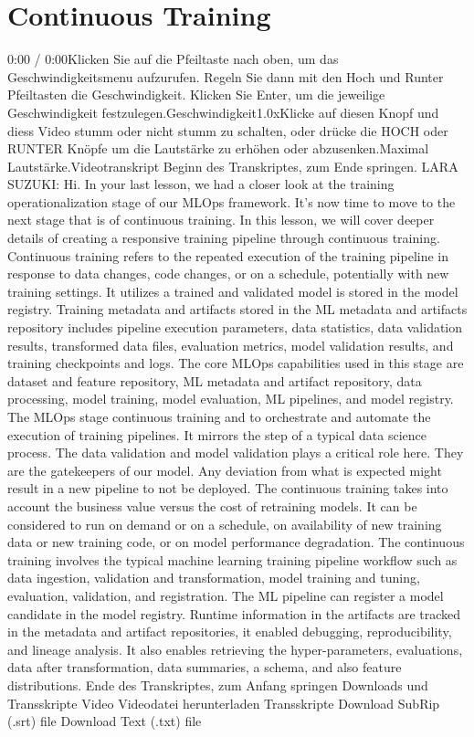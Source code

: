 {{{{\section{Continuous Training}


    0:00 / 0:00Klicken Sie auf die Pfeiltaste nach oben, um das Geschwindigkeitsmenu aufzurufen. Regeln Sie dann mit den Hoch und Runter Pfeiltasten die Geschwindigkeit. Klicken Sie Enter, um die jeweilige Geschwindigkeit festzulegen.Geschwindigkeit1.0xKlicke auf diesen Knopf und diess Video stumm oder nicht stumm zu schalten, oder drücke die HOCH oder RUNTER Knöpfe um die Lautstärke zu erhöhen oder abzusenken.Maximal Lautstärke.Videotranskript
    Beginn des Transkriptes, zum Ende springen.
    LARA SUZUKI: Hi.
    In your last lesson, we had a closer look at the training operationalization
    stage of our MLOps framework.
    It's now time to move to the next stage that is of continuous training.
    In this lesson, we will cover deeper details
    of creating a responsive training pipeline through continuous training.
    Continuous training refers to the repeated execution
    of the training pipeline in response to data changes, code changes,
    or on a schedule, potentially with new training settings.
    It utilizes a trained and validated model is stored in the model registry.
    Training metadata and artifacts stored in the ML metadata and artifacts
    repository includes pipeline execution parameters, data statistics,
    data validation results, transformed data files, evaluation metrics,
    model validation results, and training checkpoints and logs.
    The core MLOps capabilities used in this stage
    are dataset and feature repository, ML metadata and artifact repository,
    data processing, model training, model evaluation, ML pipelines,
    and model registry.
    The MLOps stage continuous training and to orchestrate and automate
    the execution of training pipelines.
    It mirrors the step of a typical data science process.
    The data validation and model validation plays a critical role here.
    They are the gatekeepers of our model.
    Any deviation from what is expected might result in a new pipeline
    to not be deployed.
    The continuous training takes into account
    the business value versus the cost of retraining models.
    It can be considered to run on demand or on a schedule,
    on availability of new training data or new training code,
    or on model performance degradation.
    The continuous training involves the typical machine
    learning training pipeline workflow such as data ingestion, validation
    and transformation, model training and tuning, evaluation, validation,
    and registration.
    The ML pipeline can register a model candidate in the model registry.
    Runtime information in the artifacts are tracked in the metadata and artifact
    repositories, it enabled debugging, reproducibility, and lineage analysis.
    It also enables retrieving the hyper-parameters, evaluations, data
    after transformation, data summaries, a schema, and also feature distributions.
    Ende des Transkriptes, zum Anfang springen
    Downloads und Transskripte
    Video
    Videodatei herunterladen
    Transskripte
    Download SubRip (.srt) file
    Download Text (.txt) file        
  
}}}}
